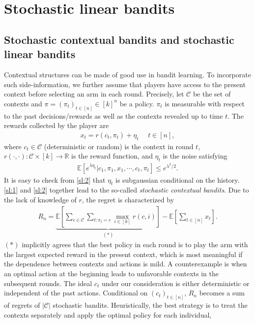\documentclass[10pt,a4paper]{amsart}
\numberwithin{equation}{section}
\theoremstyle{plain}
\theoremstyle{definition}
\def\R{{\mathbb R}}
\def\E{{\mathbb E}}
\def\R{{\mathbb R}}
\begin{document}
\section{Stochastic linear bandits}

\subsection{Stochastic contextual bandits and stochastic linear bandits}

Contextual structures can be made of good use in bandit learning. To incorporate such side-information, we further assume that players have access to the present context before selecting an arm in each round. Precisely, let $\mathcal C$ be the set of contexts and $\pi=(\pi_t)_{t\in [n]}\in [k]^n$ be a policy. $\pi_t$ is measurable with respect to the past decisions/rewards as well as the contexts revealed up to time $t$. The rewards collected by the player are 
\begin{align}
x_{t} = r(c_t, \pi_t)+\eta_{t}\ \ \ \ \ \ t\in [n],\label{sl:1}
\end{align}
where $c_t\in\mathcal C$ (deterministic or random) is the context in round $t$, $r(\cdot, \cdot):\mathcal C\times [k]\to\R$ is the reward function, and $\eta_{t}$ is the noise satisfying 
\begin{align}
\E[e^{\lambda\eta_{t}}|c_{1}, \pi_{1}, x_{1}, \cdots, c_{t}, \pi_{t}]\leq e^{\lambda^2/2}. \label{sl:2}
\end{align}
It is easy to check from \eqref{sl:2} that $\eta_t$ is subgaussian conditional on the history. \eqref{sl:1} and \eqref{sl:2} together lead to the so-called \emph{stochastic contextual bandits}. Due to the lack of knowledge of $r$, the regret is characterized by 
\begin{align}
R_n = \underbrace{\E\left[\sum_{c\in\mathcal C}\sum_{t: \pi_t = c}\max_{i\in [k]}r(c, i)\right]}_{(*)} - \E\left[\sum_{t\in [n]}x_{t}\right]. \label{sl:reg}
\end{align}
$(*)$ implicitly agrees that the best policy in each round is to play the arm with the largest expected reward in the present context, which is most meaningful if the dependence between contexts and actions is mild. A counterexample is when an optimal action at the beginning leads to unfavorable contexts in the subsequent rounds. The ideal $c_t$ under our consideration is either deterministic or independent of the past actions.  Conditional on $(c_t)_{t\in [n]}$, $R_n$ becomes a sum of regrets of $|\mathcal C|$ stochastic bandits. Heuristically, the best strategy is to treat the contexts separately and apply the optimal policy for each individual,  
\end{document}
